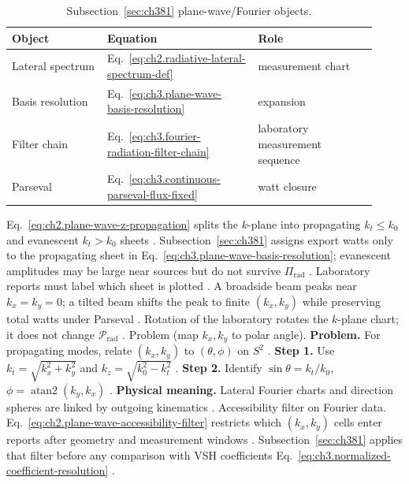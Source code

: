 \begin{table}[t]
\centering
\caption{Subsection~\ref{sec:ch381} plane-wave/Fourier objects.}
\label{tab:ch3.381-fourier-objects}
\small
\begin{tabular}{@{}p{0.24\linewidth}p{0.38\linewidth}p{0.30\linewidth}@{}}
\toprule
Object & Equation & Role \\
\midrule
Lateral spectrum & Eq.~\eqref{eq:ch2.radiative-lateral-spectrum-def} & measurement chart \\
Basis resolution & Eq.~\eqref{eq:ch3.plane-wave-basis-resolution} & expansion \\
Filter chain & Eq.~\eqref{eq:ch3.fourier-radiation-filter-chain} & laboratory measurement sequence \\
Parseval & Eq.~\eqref{eq:ch3.continuous-parseval-flux-fixed} & watt closure \\
\bottomrule
\end{tabular}
\end{table}
Eq.~\eqref{eq:ch2.plane-wave-z-propagation} splits the \(k\)-plane into propagating \(k_{t}\le k_{0}\) and evanescent
\(k_{t}>k_{0}\) sheets \cite{jackson1999}. Subsection~\ref{sec:ch381} assigns export watts only to the
propagating sheet in Eq.~\eqref{eq:ch3.plane-wave-basis-resolution}; evanescent amplitudes may be large near sources but
do not survive \(\Pi_{\mathrm{rad}}\) \cite{harrington2001}. Laboratory reports must label which sheet is plotted
\cite{hansen1988}.
A broadside beam peaks near \(k_{x}=k_{y}=0\); a tilted beam shifts the peak to finite \((k_{x},k_{y})\) while preserving
total watts under Parseval \cite{jackson1999}. Rotation of the laboratory rotates the \(k\)-plane chart; it does not
change \(\mathcal{P}_{\mathrm{rad}}\) \cite{stratton1941}.
Problem (map \(k_{x},k_{y}\) to polar angle). \textbf{Problem.} For propagating modes, relate \((k_{x},k_{y})\) to \((\theta,\phi)\) on \(S^{2}\)
\cite{jackson1999}.
\textbf{Step 1.} Use \(k_{t}=\sqrt{k_{x}^{2}+k_{y}^{2}}\) and \(k_{z}=\sqrt{k_{0}^{2}-k_{t}^{2}}\) \cite{jackson1999}.
\textbf{Step 2.} Identify \(\sin\theta=k_{t}/k_{0}\), \(\phi=\operatorname{atan2}(k_{y},k_{x})\) \cite{stratton1941}.
\textbf{Physical meaning.} Lateral Fourier charts and direction spheres are linked by outgoing kinematics \cite{hansen1988}.
Accessibility filter on Fourier data. Eq.~\eqref{eq:ch2.plane-wave-accessibility-filter} restricts which \((k_{x},k_{y})\) cells enter reports after geometry and
measurement windows \cite{harrington2001}. Subsection~\ref{sec:ch381} applies that filter before any comparison with
VSH coefficients Eq.~\eqref{eq:ch3.normalized-coefficient-resolution} \cite{hansen1988}.
